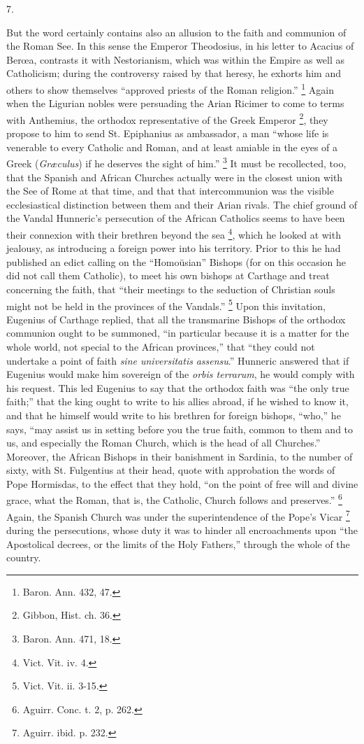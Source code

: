 7.

But the word certainly contains also an allusion to the faith and
communion of the Roman See. In this sense the Emperor Theodosius, in
his letter to Acacius of Berœa, contrasts it with Nestorianism, which
was within the Empire as well as Catholicism; during the controversy
raised by that heresy, he exhorts him and others to show themselves
``approved priests of the Roman religion.'' \footnote{Baron. Ann. 432, 47.} Again when the Ligurian nobles were persuading the Arian
Ricimer to come to terms with Anthemius, the orthodox representative
of the Greek Emperor \footnote{Gibbon, Hist. ch. 36.},
they propose to him to send St. Epiphanius as ambassador, a man
``whose life is venerable to every Catholic and Roman, and at
least amiable in the eyes of a Greek (\emph{Græculus}) if he deserves
the sight of him.'' \footnote{Baron. Ann. 471, 18.}
It must be recollected, too, that the Spanish and African Churches
actually were in the closest union with the See of Rome at that time,
and that that intercommunion was the visible ecclesiastical
distinction between them and their Arian rivals. The chief ground of
the Vandal Hunneric's persecution of the African Catholics seems to
have been their connexion with their brethren beyond the sea \footnote{Vict. Vit. iv. 4.}, which he looked at with jealousy, as introducing a foreign
power into his territory. Prior to this he had published an edict
calling on the ``Homoüsian'' Bishops (for on this occasion he
did not call them Catholic), to meet his own bishops at Carthage and
treat concerning the faith, that ``their meetings to the seduction
of Christian souls might not be held in the provinces of the
Vandals.'' \footnote{Vict. Vit. ii. 3-15.} Upon
this invitation, Eugenius of Carthage replied, that all the
transmarine Bishops of the orthodox communion ought to be summoned,
``in particular because it is a matter for the whole world, not
special to the African provinces,'' that ``they could not
undertake a point of faith \emph{sine universitatis }\emph{assensu}.''
Hunneric answered that if Eugenius would make him sovereign of the \emph{orbis
terrarum}, he would comply with his request. This led Eugenius to
say that the orthodox faith was ``the only true faith;'' that
the king ought to write to his allies abroad, if he wished to know it,
and that he himself would write to his brethren for foreign bishops,
``who,'' he says, ``may assist us in setting before you
the true faith, common to them and to us, and especially the Roman
Church, which is the head of all Churches.'' Moreover, the African
Bishops in their banishment in Sardinia, to the number of sixty, with
St. Fulgentius at their head, quote with approbation the words of Pope
Hormisdas, to the effect that they hold, ``on the point of free
will and divine grace, what the Roman, that is, the Catholic, Church
follows and preserves.'' \footnote{Aguirr. Conc. t. 2, p. 262.} Again, the Spanish Church was under the superintendence of
the Pope's Vicar \footnote{Aguirr. ibid. p. 232.}
during the persecutions, whose duty it was to hinder all encroachments
upon ``the Apostolical decrees, or the limits of the Holy
Fathers,'' through the whole of the country.


